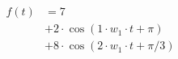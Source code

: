\correct
\begin{center}
\begin{align*}
f(t)
&= 7 \\
&+ 2 \cdot \cos( 1 \cdot w_1 \cdot t + \pi) \\
&+ 8 \cdot \cos( 2 \cdot w_1 \cdot t + \pi/3)
\end{align*}
\end{center}
